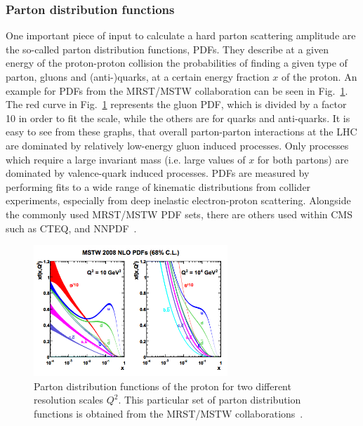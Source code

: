 \subsubsection*{Parton distribution functions}
One important piece of input to calculate a hard parton scattering amplitude are the so-called parton distribution functions, PDFs. They describe at a given energy of the proton-proton
collision the probabilities of finding a given type of parton, gluons and (anti-)quarks, at a certain energy fraction $x$ of the proton. An example for PDFs from the MRST/MSTW collaboration
can be seen in Fig.~\ref{fig:pdfs}.  The red curve in Fig.~\ref{fig:pdfs} represents the gluon PDF, which is divided by a factor 10 in order to fit the scale, 
while the others are for quarks and anti-quarks. It is easy to see from these graphs, that overall parton-parton interactions at the LHC are dominated by relatively low-energy
gluon induced processes. Only processes which require a large invariant mass (i.e. large values of $x$ for both partons) are dominated by valence-quark induced processes. PDFs are measured
by performing fits to a wide range of kinematic distributions from collider experiments, especially from deep inelastic electron-proton scattering. Alongside
the commonly used MRST/MSTW PDF sets, there are others used within CMS such as CTEQ, and NNPDF~\cite{nnpdf,cteq}. 

\begin{figure}[h!]
    \centering
    \includegraphics[width=0.65\textwidth]{../figs/pdfs.png}
    \caption{Parton distribution functions of the proton for two different resolution scales $Q^2$. This particular set of parton
    distribution functions is obtained from the MRST/MSTW collaborations~\cite{mstw}.}
    \label{fig:pdfs}
\end{figure}

